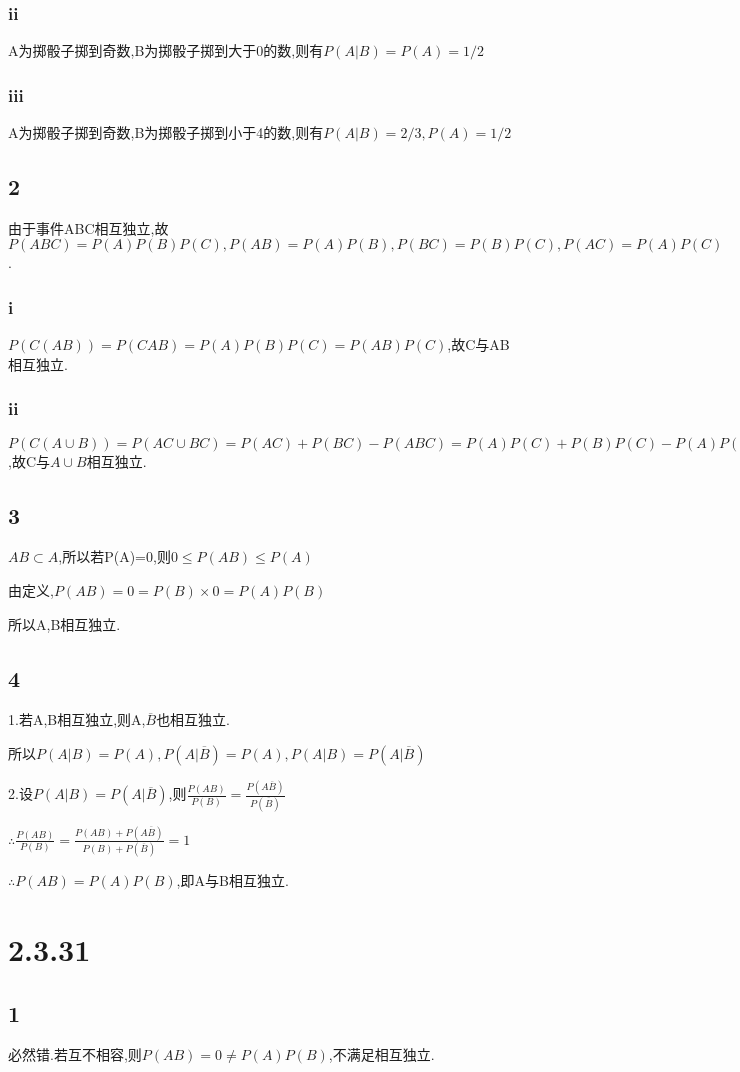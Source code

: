 \documentclass[12pt,a4paper]{ctexart}
\begin{document}
\subsubsection*{ii}
A为掷骰子掷到奇数,B为掷骰子掷到大于0的数,则有$P(A|B)=P(A)=1/2$
\subsubsection*{iii}
A为掷骰子掷到奇数,B为掷骰子掷到小于4的数,则有$P(A|B)=2/3,P(A)=1/2$
\subsection*{2}
由于事件ABC相互独立,故$P(ABC)=P(A)P(B)P(C),P(AB)=P(A)P(B),P(BC)=P(B)P(C),P(AC)=P(A)P(C)$.

\subsubsection*{i}
$P(C(AB))=P(CAB)=P(A)P(B)P(C)=P(AB)P(C)$,故C与AB相互独立.
\subsubsection*{ii}
$P(C(A\cup B))=P(AC\cup BC)=P(AC)+P(BC)-P(ABC)=P(A)P(C)+P(B)P(C)-P(A)P(B)P(C)=P(C)[P(A)+P(B)-P(AB)]=P(C)P(A\cup B)$,故C与$A\cup B$相互独立.
\subsection*{3}
$AB\subset A$,所以若P(A)=0,则$0\leq P(AB)\leq P(A)$

由定义,$P(AB)=0=P(B)\times 0=P(A)P(B)$

所以A,B相互独立.
\subsection*{4}
1.若A,B相互独立,则A,$\overline{B}$也相互独立.

所以$P(A|B)=P(A),P(A|\overline{B})=P(A),P(A|B)=P(A|\overline{B})$

2.设$P(A|B)=P(A|\overline{B})$,则$\frac{P(AB)}{P(B)}=\frac{P(A\overline{B})}{P(\overline{B})}$

$\therefore \frac{P(AB)}{P(B)}=\frac{P(AB)+P(A\overline{B})}{P(B)+P(\overline{B})}=1$

$\therefore P(AB)=P(A)P(B)$,即A与B相互独立.
\section*{2.3.31}
\subsection*{1}
必然错.若互不相容,则$P(AB)=0\neq P(A)P(B)$,不满足相互独立.
\end{document}
